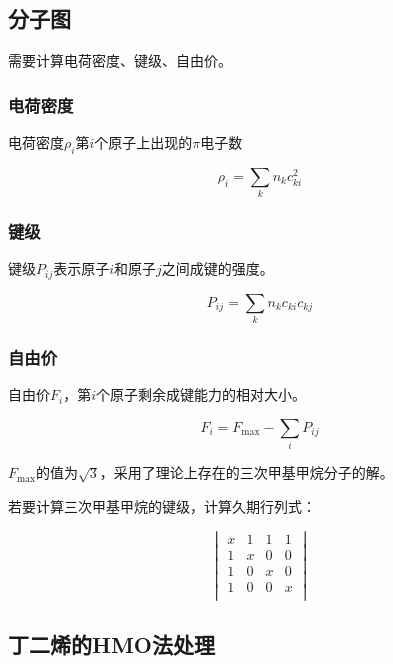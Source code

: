 \subsection{分子图}

需要计算电荷密度、键级、自由价。

\subsubsection{电荷密度}

电荷密度$\rho_i$第$i$个原子上出现的$\pi$电子数

\begin{equation*}
    \rho_i = \sum_{k} n_k c^2_{ki}
\end{equation*}

\subsubsection{键级}

键级$P_{ij}$表示原子$i$和原子$j$之间成键的强度。

\begin{equation*}
    P_{ij} = \sum_k n_k c_{ki} c_{kj}
\end{equation*}

\subsubsection{自由价}

自由价$F_i$，第$i$个原子剩余成键能力的相对大小。

\begin{equation*}
    F_i = F_{\mathrm{max}} - \sum_i P_{ij}
\end{equation*}


$F_{\mathrm{max}}$的值为$\sqrt{3}$，采用了理论上存在的三次甲基甲烷分子的解。

若要计算三次甲基甲烷的键级，计算久期行列式：

\begin{equation*}
    \begin{vmatrix}
        x & 1 & 1 & 1 \\
        1 & x & 0 & 0 \\
        1 & 0 & x & 0 \\
        1 & 0 & 0 & x \\
    \end{vmatrix}
\end{equation*}


\subsection{丁二烯的HMO法处理}

